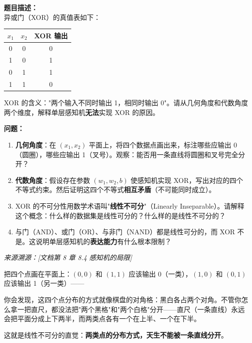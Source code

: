 \documentclass[a4paper,11pt]{ctexart}
\begin{document}
\begin{problembox}
    \textbf{题目描述：}\\
    异或门（XOR）的真值表如下：

    \begin{center}
    \begin{tabular}{ccc}
        \toprule
        $x_1$ & $x_2$ & XOR 输出 \\
        \midrule
        0 & 0 & 0 \\
        1 & 0 & 1 \\
        0 & 1 & 1 \\
        1 & 1 & 0 \\
        \bottomrule
    \end{tabular}
    \end{center}

    XOR 的含义："两个输入不同时输出 1，相同时输出 0"。请从几何角度和代数角度两个维度，解释单层感知机\textbf{无法}实现 XOR 的原因。

    \vspace{0.2cm}
    \textbf{问题：}
    \begin{enumerate}[(1)]
        \item \textbf{几何角度}：在 $(x_1, x_2)$ 平面上，将四个数据点画出来，标注哪些应输出 0（圆圈），哪些应输出 1（叉号）。观察：能否用一条直线将圆圈和叉号完全分开？

        \item \textbf{代数角度}：假设存在参数 $(w_1, w_2, b)$ 使感知机实现 XOR，写出对应的四个不等式约束。然后证明这四个不等式\textbf{相互矛盾}（不可能同时成立）。

        \item XOR 的不可分性用数学术语叫"\textbf{线性不可分}"（Linearly Inseparable）。请解释这个概念：什么样的数据集是线性可分的？什么样的是线性不可分的？

        \item 与门（AND）、或门（OR）、与非门（NAND）都是线性可分的，而 XOR 不是。这说明单层感知机的\textbf{表达能力}有什么根本限制？
    \end{enumerate}

    \vspace{0.2cm}
    {\color{gray}\small\textit{来源溯源：[文档第 8 章 8.4 感知机的局限]}}
\end{problembox}

\begin{metaphorbox}
    把四个点画在平面上：$(0,0)$ 和 $(1,1)$ 应该输出 0（一类），$(1,0)$ 和 $(0,1)$ 应该输出 1（另一类）——

    你会发现，这四个点分布的方式就像棋盘的对角格：黑白各占两个对角。不管你怎么拿一把直尺，都没法把"两个黑格"和"两个白格"分开——直尺（一条直线）永远会把平面分成上下两半，而两类点各有一个在上半、一个在下半。

    这就是线性不可分的直觉：\textbf{两类点的分布方式，天生不能被一条直线分开}。
\end{metaphorbox}
\end{document}
